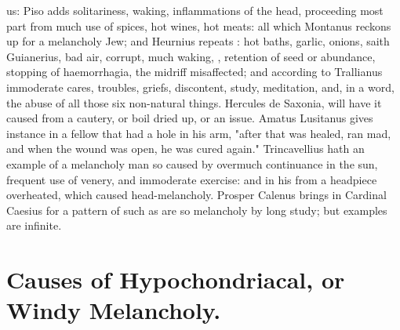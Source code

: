 us: Piso adds solitariness, waking, inflammations of the head, proceeding most
part from much use of spices, hot wines, hot meats: all
which Montanus reckons up  for a melancholy
Jew; and Heurnius repeats : hot baths,
garlic, onions, saith Guianerius, bad air, corrupt, much
waking, \etc{}, retention of seed or abundance, stopping
of haemorrhagia, the midriff misaffected; and according to Trallianus
 immoderate cares, troubles, griefs,
discontent, study, meditation, and, in a word, the abuse of all those six
non-natural things. Hercules de Saxonia,  will have it caused from a cautery, or boil dried up,
or an issue. Amatus Lusitanus  gives
instance in a fellow that had a hole in his arm, "after
that was healed, ran mad, and when the wound was open, he was cured again."
Trincavellius  hath an example of a
melancholy man so caused by overmuch continuance in the sun, frequent use of
venery, and immoderate exercise: and in his  from a headpiece overheated, which caused
head-melancholy. Prosper Calenus brings in Cardinal Caesius for a pattern of
such as are so melancholy by long study; but examples are infinite.

\section{Causes of Hypochondriacal, or Windy Melancholy.}

